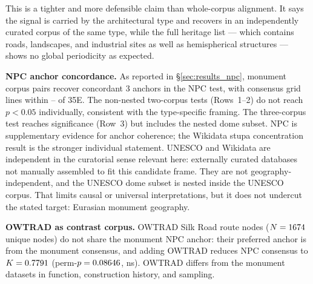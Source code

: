 This is a tighter and more defensible claim than whole-corpus
alignment. It says the signal is carried by the architectural type
and recovers in an independently curated corpus of the same type,
while the full heritage list --- which contains roads, landscapes,
and industrial sites as well as hemispherical structures --- shows
no global periodicity as expected.

\textbf{NPC anchor concordance.}
As reported in \S\ref{sec:results_npc}, monument corpus pairs recover
concordant 3\textdegree{} anchors in the NPC test, with consensus
grid lines within
\npcDomeStupaGridDeltaE\textdegree{}--\npcTwoGridDeltaE\textdegree{}
of 35\textdegree{}E. The non-nested two-corpus tests (Rows~1--2) do
not reach $p<0.05$ individually, consistent with the type-specific
framing. The three-corpus test reaches significance (Row~3) but
includes the nested dome subset. NPC is supplementary evidence for
anchor coherence; the Wikidata stupa concentration result is the
stronger individual statement.
UNESCO and Wikidata are independent in the curatorial sense relevant
here: externally curated databases not manually assembled to fit this
candidate frame. They are not geography-independent, and the UNESCO
dome subset is nested inside the UNESCO corpus. That limits causal or
universal interpretations, but it does not undercut the stated target:
Eurasian monument geography.

\textbf{OWTRAD as contrast corpus.}
OWTRAD Silk Road route nodes ($N=1674{}$ unique nodes) do not
share the monument NPC anchor: their preferred anchor is
\npcOwAnchorDelta\textdegree{} from the monument consensus, and adding
OWTRAD reduces NPC consensus to $K=0.7791{}$
(perm-$p=0.08646{}$, ns). OWTRAD differs from the monument datasets in
function, construction history, and sampling.

